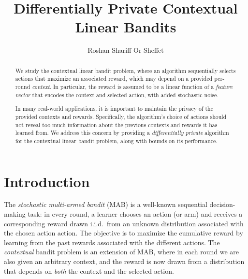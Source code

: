 \documentclass{article}
\title{Differentially Private Contextual Linear Bandits}
\author{
  Roshan Shariff
  \And
  Or Sheffet
}
\begin{document}
\maketitle

\begin{abstract}
  We study the contextual linear bandit problem, where an algorithm
  sequentially selects actions that maximize an associated reward,
  which may depend on a provided per-round \emph{context}.  In
  particular, the reward is assumed to be a linear function of a
  \emph{feature vector} that encodes the context and selected action,
  with added stochastic noise.

  In many real-world applications, it is important to maintain the
  privacy of the provided contexts and rewards.  Specifically, the
  algorithm's choice of actions should not reveal too much information
  about the previous contexts and rewards it has learned from.  We
  address this concern by providing a \emph{differentially private}
  algorithm for the contextual linear bandit problem, along with
  bounds on its performance.
\end{abstract}

\section{Introduction}
\label{sec:introduction}

The \emph{stochastic multi-armed bandit} (MAB) is a well-known
sequential decision-making task: in every round, a learner chooses an
action (or arm) and receives a corresponding reward drawn i.i.d.\ from
an unknown distribution associated with the chosen action action.  The
objective is to maximize the cumulative reward by learning from the
past rewards associated with the different actions.  The
\emph{contextual} bandit problem is an extension of MAB, where in each
round we are also given an arbitrary context, and the reward is now
drawn from a distribution that depends on \emph{both} the context and
the selected action.

\end{document}
